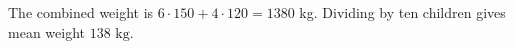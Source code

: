 The combined weight is $6\cdot150+4\cdot120=1380$ kg. Dividing by ten children gives mean weight $\boxed{138\text{ kg}}$.
